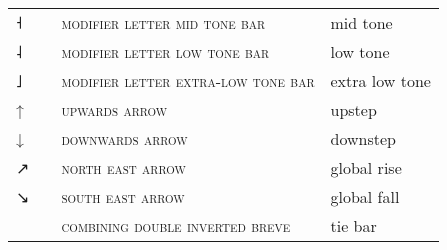 \begin{center}
\begin{xtabular}{ l L{1.1cm} L{6.2cm} L{3.6cm} }
{˧} &  & \textsc{modifier letter mid tone bar} & mid tone \\
{˨} &  & \textsc{modifier letter low tone bar} & low tone \\
{˩} &  & \textsc{modifier letter extra-low tone bar} & extra low tone \\
{↑} &  & \textsc{upwards arrow} & upstep \\
{↓} &  & \textsc{downwards arrow} & downstep \\
{↗} &  & \textsc{north east arrow} & global rise \\
{↘} &  & \textsc{south east arrow} & global fall \\
 &  & \textsc{combining double inverted breve} & tie bar \\
\end{xtabular}
\end{center}